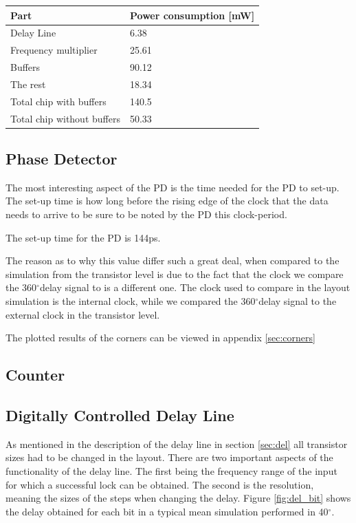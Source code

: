 \documentclass[a4paper,12pt]{article} \usepackage{graphicx}
\newcommand{\degree}{\ensuremath{^\circ}}
\begin{document}
\begin{tabular}{ l | l }
Part & Power consumption [mW] \\
\hline
Delay Line & 6.38 \\
Frequency multiplier & 25.61 \\
Buffers & 90.12 \\
The rest & 18.34 \\ \hline
Total chip with buffers & 140.5 \\
Total chip without buffers & 50.33
\end{tabular}

\subsection{Phase Detector}
The most interesting aspect of the PD is the time needed for the PD to set-up.
 The set-up time is how long before the rising edge of the clock that the data
 needs to arrive to be sure to be noted by the PD this clock-period.

The set-up time for the PD is 144ps.

The reason as to why this value differ such a great deal, when compared 
to the simulation from the transistor level is due to the fact that the 
clock we compare the 360\degree delay signal to is a different one.
The clock used to compare in the layout simulation is the internal clock, while 
we compared the 360\degree delay signal to the external clock in the transistor level.

The plotted results of the corners can be viewed in appendix \ref{sec:corners}

\subsection{Counter}

\subsection{Digitally Controlled Delay Line}
As mentioned in the description of the delay line in section \ref{sec:del} all
transistor sizes had to be changed in the layout. There are two important aspects of
the functionality of the delay line. The first being the frequency range of the input
for which a successful lock can be obtained. The second is the resolution,
meaning the sizes of the steps when changing the delay. Figure \ref{fig:del_bit}
shows the delay obtained for each bit in a typical mean simulation performed in
40\degree.
\end{document}
